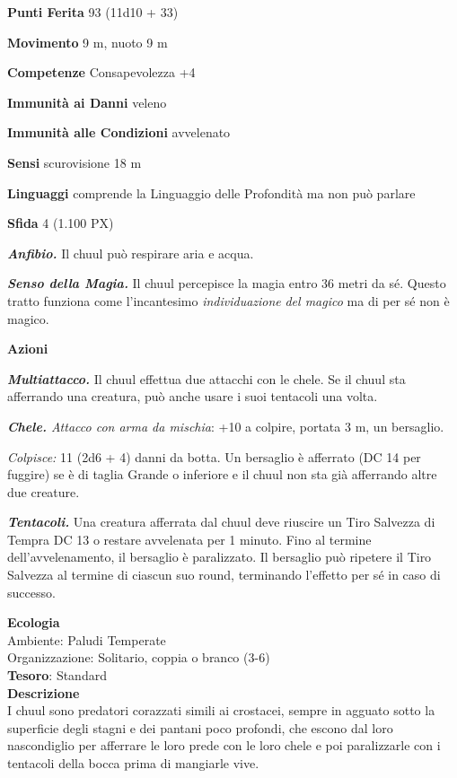 \begin{multicols}{2}
	\textbf{Punti Ferita} 93 (11d10 + 33)

	\textbf{Movimento} 9 m, nuoto 9 m

	\textbf{Competenze} Consapevolezza +4

	\textbf{Immunità ai Danni} veleno

	\textbf{Immunità alle Condizioni} avvelenato

	\textbf{Sensi} scurovisione 18 m

	\textbf{Linguaggi} comprende la Linguaggio delle Profondità ma non può parlare

	\textbf{Sfida} 4 (1.100 PX)

	\textit{\textbf{Anfibio.}} Il chuul può respirare aria e acqua.

	\textit{\textbf{Senso della Magia.}} Il chuul percepisce la magia entro 36 metri da sé. Questo tratto funziona come l'incantesimo \textit{individuazione} \textit{del magico} ma di per sé non è magico.

	\textbf{Azioni}

	\textit{\textbf{Multiattacco.}} Il chuul effettua due attacchi con le chele. Se il chuul sta afferrando una creatura, può anche usare i suoi tentacoli una volta.

	\textit{\textbf{Chele.} Attacco con arma da mischia}: +10 a colpire, portata 3 m, un bersaglio.

	\textit{Colpisce:} 11 (2d6 + 4) danni da botta. Un bersaglio è afferrato (DC 14 per fuggire) se è di taglia Grande o inferiore e il chuul non sta già afferrando altre due creature.

	\textit{\textbf{Tentacoli.}} Una creatura afferrata dal chuul deve riuscire un Tiro Salvezza di Tempra DC 13 o restare avvelenata per 1 minuto. Fino al termine dell'avvelenamento, il bersaglio è paralizzato. Il bersaglio può ripetere il Tiro Salvezza al termine di ciascun suo round, terminando l'effetto per sé in caso di successo.

	\textbf{Ecologia}\\
	Ambiente: Paludi Temperate\\
	Organizzazione: Solitario, coppia o branco (3-6)\\
	\textbf{Tesoro}: Standard\\
	\textbf{Descrizione}\\
	I chuul sono predatori corazzati simili ai crostacei, sempre in agguato sotto la superficie degli stagni e dei pantani poco profondi, che escono dal loro nascondiglio per afferrare le loro prede con le loro chele e poi paralizzarle con i tentacoli della bocca prima di mangiarle vive.


\end{multicols}
